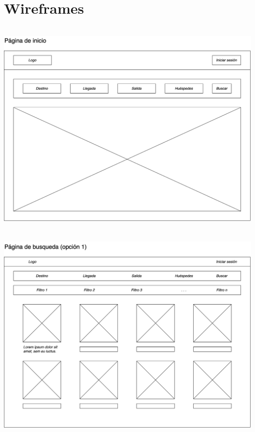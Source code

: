 \section{\bfseries\LARGE Wireframes}

\begin{center}
    \includegraphics[width=16cm, height=11cm]{img/wireframe_inicio.png}
    \includegraphics[width=16cm, height=11cm]{img/wireframe_busqueda01.png}

\end{center}
